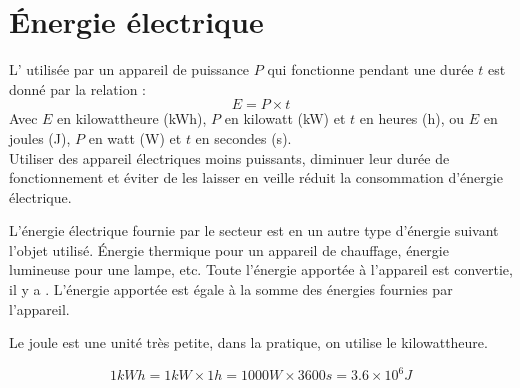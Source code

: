 \documentclass[12pt,a4paper]{article}
\begin{document}
\section{\'Energie électrique}

\begin{mybilan}

	L' utilisée par un appareil de puissance $P$ qui fonctionne pendant une durée $t$ est donné par la relation :
	\begin{equation*}
		E = P \times t
	\end{equation*}
	Avec $E$ en kilowattheure (kWh), $P$ en kilowatt (kW) et $t$ en heures (h), ou  $E$ en joules (J), $P$ en watt (W) et $t$ en secondes (s).\\

	Utiliser des appareil électriques moins puissants, diminuer leur durée de fonctionnement et éviter de les laisser en veille réduit la consommation d'énergie électrique.
	
	L'énergie électrique fournie par le secteur est  en un autre type d'énergie suivant l'objet utilisé. \'Energie thermique pour un appareil de chauffage, énergie lumineuse pour une lampe, etc.
	Toute l'énergie apportée à l'appareil est convertie, il y a . L'énergie apportée est égale à la somme des énergies fournies par l'appareil.
 
\end{mybilan}

\begin{myrem}
	Le joule est une unité très petite, dans la pratique, on utilise le kilowattheure.

	\begin{equation*}
		1 kWh = 1 kW \times 1h = 1000 W \times 3600 s = \num{3.6} \times 10^{6} J
	\end{equation*}
\end{myrem}


\end{document}

